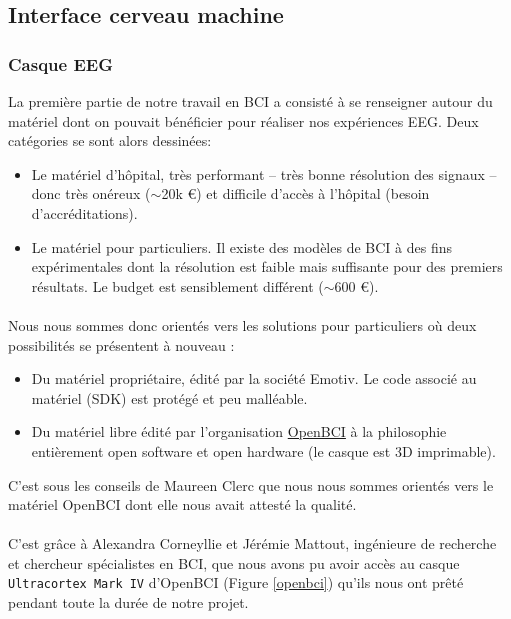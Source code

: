 \documentclass[11pt,a4paper]{article}
\theoremstyle{plain}
\theoremstyle{definition}
\begin{document}
\subsection{Interface cerveau machine}
\subsubsection{Casque EEG}
La première partie de notre travail en BCI a consisté à se renseigner autour du matériel dont on pouvait bénéficier pour réaliser nos expériences EEG. Deux catégories se sont alors dessinées:
\begin{itemize}
    \item Le matériel d'hôpital, très performant -- très bonne résolution des signaux -- donc très onéreux ($\sim$20k \euro{}) et difficile d'accès à l'hôpital (besoin d'accréditations).
    \item Le matériel pour particuliers. Il existe des modèles de BCI à des fins expérimentales dont la résolution
    est faible mais suffisante pour des premiers résultats. Le budget est sensiblement différent ($\sim$600 \euro{}).
\end{itemize}

\paragraph{} Nous nous sommes donc orientés vers les solutions pour particuliers où deux possibilités se présentent à nouveau :
\begin{itemize}
    \item Du matériel propriétaire, édité par la société Emotiv. Le code associé au matériel (SDK) est protégé et peu malléable.
    \item Du matériel libre édité par l'organisation \href{http://openbci.com/}{OpenBCI} à la philosophie entièrement open software et open hardware (le casque est 3D imprimable).
\end{itemize}
C'est sous les conseils de Maureen Clerc que nous nous sommes orientés vers le matériel OpenBCI dont elle nous avait attesté la qualité.

\paragraph{} C'est grâce à Alexandra Corneyllie et Jérémie Mattout, ingénieure de recherche et chercheur spécialistes en BCI, que nous avons pu avoir accès au casque \texttt{Ultracortex Mark IV} d'OpenBCI (Figure \ref{openbci}) qu'ils nous ont prêté pendant toute la durée de notre projet.
\end{document}
